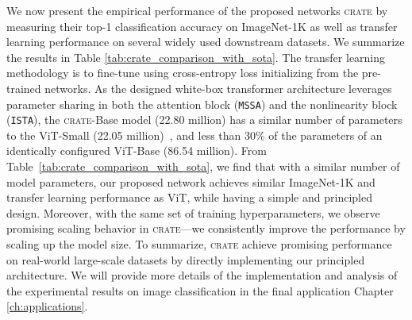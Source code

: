 \documentclass[../../book-main.tex]{subfiles}
\begin{document}


We now present the empirical performance of the proposed networks \textsc{crate} by measuring their top-1 classification accuracy on ImageNet-1K as well as transfer learning performance on several widely used downstream datasets. 
We summarize the results in Table \ref{tab:crate_comparison_with_sota}. The transfer learning methodology is to fine-tune using cross-entropy loss initializing from the pre-trained networks. 
As the designed white-box transformer architecture leverages parameter sharing in both the attention block (\texttt{MSSA}) and the nonlinearity block (\texttt{ISTA}), the \textsc{crate}{-Base} model (22.80 million) 
has a similar number of parameters to the ViT-Small (22.05 million)~\cite{dosovitskiy2020image}, and less than 30\% of the parameters of an identically configured ViT-Base (86.54 million). 
From Table~\ref{tab:crate_comparison_with_sota}, we find that with a similar number of model parameters, our proposed network achieves similar ImageNet-1K and transfer learning performance as ViT, while having a simple and principled design. Moreover, with the same set of training hyperparameters, we observe promising scaling behavior in \textsc{crate}---we consistently improve the performance by scaling up the model size. To summarize, \textsc{crate} achieve promising performance on real-world large-scale datasets by directly implementing our principled architecture. We will provide more details of the implementation and analysis of the experimental results on image classification in the final application Chapter \ref{ch:applications}.
\end{document}
